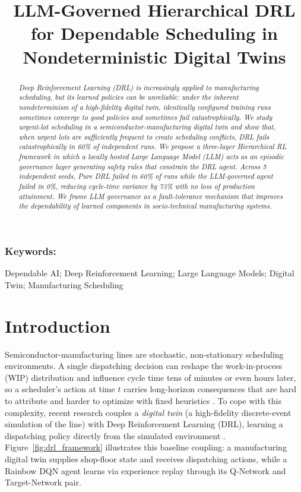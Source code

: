 \documentclass[10pt]{article}
\title{LLM-Governed Hierarchical DRL for Dependable Scheduling
in Nondeterministic Digital Twins}
\date{}
\begin{document}
\maketitle

\begin{abstract}
\textit{%
Deep Reinforcement Learning (DRL) is increasingly applied to manufacturing
scheduling, but its learned policies can be unreliable: under the inherent
nondeterminism of a high-fidelity digital twin, identically configured training
runs sometimes converge to good policies and sometimes fail catastrophically.
We study urgent-lot scheduling in a semiconductor-manufacturing digital twin and
show that, when urgent lots are sufficiently frequent to create scheduling
conflicts, DRL fails catastrophically in 60\% of independent runs.
We propose a three-layer Hierarchical RL framework in which a
locally hosted Large Language Model (LLM) acts as an episodic governance layer
generating safety rules that constrain the DRL agent.
Across 5 independent seeds, Pure DRL failed in 60\% of runs while the
LLM-governed agent failed in 0\%, reducing cycle-time variance by 73\%
with no loss of production attainment.
We frame LLM governance as a fault-tolerance mechanism that improves
the dependability of learned components in socio-technical manufacturing
systems.%
}
\end{abstract}

\subsubsection*{Keywords:}
Dependable AI; Deep Reinforcement Learning; Large Language Models; Digital Twin;
Manufacturing Scheduling

\section{Introduction}

Semiconductor-manufacturing lines are stochastic, non-stationary scheduling
environments. A single dispatching decision can reshape the work-in-process
(WIP) distribution and influence cycle time tens of minutes or even hours later,
so a scheduler's action at time $t$ carries long-horizon consequences that are
hard to attribute and harder to optimize with fixed heuristics
\parencite{moyne2017,hu2019}. To cope with this complexity, recent research couples a
\emph{digital twin} (a high-fidelity discrete-event simulation of the line) with
Deep Reinforcement Learning (DRL), learning a dispatching policy directly from
the simulated environment \parencite{waschneck2018,lee2025}.
Figure~\ref{fig:drl_framework} illustrates this baseline coupling: a
manufacturing digital twin supplies shop-floor state and receives dispatching
actions, while a Rainbow DQN agent learns via experience replay through its
Q-Network and Target-Network pair.
\end{document}

